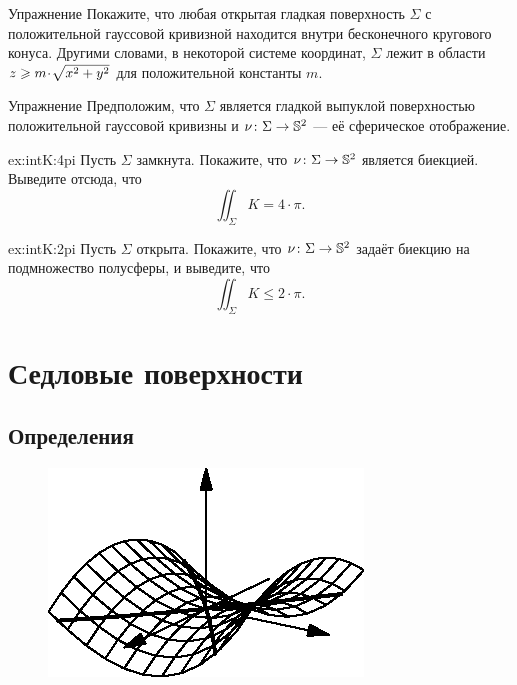 {\sloppy

\begin{thm}{Упражнение}\label{ex:circular-cone}
Покажите, что любая открытая гладкая поверхность $\Sigma$ с положительной гауссовой кривизной
находится внутри бесконечного кругового конуса.
Другими словами, в некоторой системе координат, $\Sigma$ лежит в области $z \z\ge m \cdot\sqrt{x^2 + y^2}$ для положительной константы $m$.
\end{thm}

}

\begin{thm}{Упражнение}\label{ex:intK}
Предположим, что $\Sigma$ является гладкой выпуклой поверхностью положительной гауссовой кривизны
и $\nu\colon\Sigma\to \mathbb{S}^2$ --- её сферическое отображение.

\begin{multicols}{2}

\begin{subthm}{ex:intK:4pi}
Пусть $\Sigma$ замкнута.
Покажите, что $\nu\colon\Sigma\to \mathbb{S}^2$ является биекцией.
Выведите отсюда, что 
\[\iint_\Sigma K=4\cdot\pi.\]
\end{subthm}

\columnbreak

\begin{subthm}{ex:intK:2pi}
Пусть $\Sigma$ открыта.
Покажите, что $\nu\colon\Sigma\to \mathbb{S}^2$
задаёт биекцию на подмножество полусферы,
и выведите, что 
\[\iint_\Sigma K\le 2\cdot\pi.\]
\end{subthm}

\end{multicols}

\end{thm}

\chapter{Седловые поверхности}

\section{Определения}\label{sec:saddle}

\begin{figure}
\vskip-16mm
\centering
\includegraphics{asy/saddle}
\vskip0mm
\end{figure}

